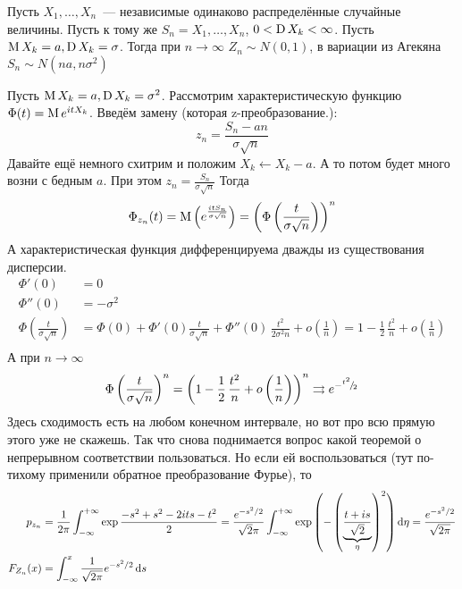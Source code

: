 \documentclass[12pt,timbord]{../../../notes}
\begin{document}
\begin{thrm}\label{prop:stat::randlimsum::sum}
  Пусть $X_1, \dotsc, X_n$~--- независимые одинаково распределённые случайные величины. Пусть к
  тому же $S_n = X_1, \dotsc, X_n$, $0 < \operatorname{\mathrm D} X_k < \infty$.
  Пусть $\operatorname{\mathrm M} X_k = a, \operatorname{\mathrm D} X_k = \sigma$. Тогда при $n\to \infty$ $Z_n \sim N(0,1)$,
  в вариации из Агекяна $S_n \sim N(na,n\sigma^2)$
\end{thrm}
\begin{itlproof}
  Пусть $\operatorname{\mathrm M} X_k = a, \operatorname{\mathrm D} X_k = \sigma^2$.
  Рассмотрим характеристическую функцию $\Phi(t) = \operatorname{\mathrm M} e^{itX_k}$. Введём замену (которая
  z-преобразование.):
  \[
    z_n = \frac{S_n - a n}{\sigma \sqrt n}
  \]
  Давайте ещё немного схитрим и положим $X_k \gets X_k- a$. А то потом будет много возни с бедным
  $a$. При этом $z_n = \frac{S_n}{\sigma \sqrt n}$
  Тогда
  \[
    \Phi_{z_n} (t) = \operatorname{\mathrm M} \left(e^{\frac{itS_n}{\sigma\sqrt n}} \right)=
    \left(\Phi\left(\frac{t}{\sigma \sqrt n} \right)\right)^n 
  \]
  А характеристическая функция дифференцируема дважды из существования дисперсии.
  \begin{align*}
    \Phi'(0) &= 0 \\
    \Phi''(0) &= - \sigma^2 \\
    \Phi\left(\frac{t}{\sigma \sqrt n} \right) 
    &= \Phi(0) + \Phi'(0) \frac{t}{\sigma \sqrt n} + \Phi''(0)\, \frac{t^2}{2\sigma^2 n} 
      + o\left(\frac{1}{n}\right)
    = 1  - \frac{1}{2}\,\frac{t^2}{n} +  o\left(\frac{1}{n}\right) \\
  \end{align*}
  А при $n\to \infty$ \[
    \Phi\left(\frac{t}{\sigma \sqrt n} \right)^n 
    = \left(1  - \frac{1}{2}\,\frac{t^2}{n} +  o\left(\frac{1}{n}\right)\right) ^n
    \rightrightarrows e^{-{}^{t^2}\!/_{\!2}}
  \]
  Здесь сходимость есть на любом конечном интервале, но вот про всю прямую этого уже не скажешь.
  Так что снова поднимается вопрос какой теоремой о непрерывном соответствии пользоваться.
  Но если ей воспользоваться (тут по-тихому применили обратное преобразование Фурье), то
  \begin{align*}
    p_{z_n}&= \frac{1}{2\pi} \int_{-\infty}^{+\infty} \exp{\frac{- s^2 + s^2 - 2its - t^2}{2}}  =
    \frac{e^{-s^2/2}}{\sqrt{2}\pi } 
    \int_{-\infty}^{+\infty} \exp\left(-\left(\underbrace{\frac{t+is}{\sqrt 2}}_\eta \right)^2\right) \mathrm{d} \eta 
    =\frac{e^{-s^2/2}}{\sqrt{2\pi} } \\
    F_{Z_n} (x) &= \int_{-\infty}^x \frac{1}{\sqrt{2\pi}} e^{-s^2/2} \, \mathrm{d} s 
  \end{align*}


\end{itlproof}
\end{document}
